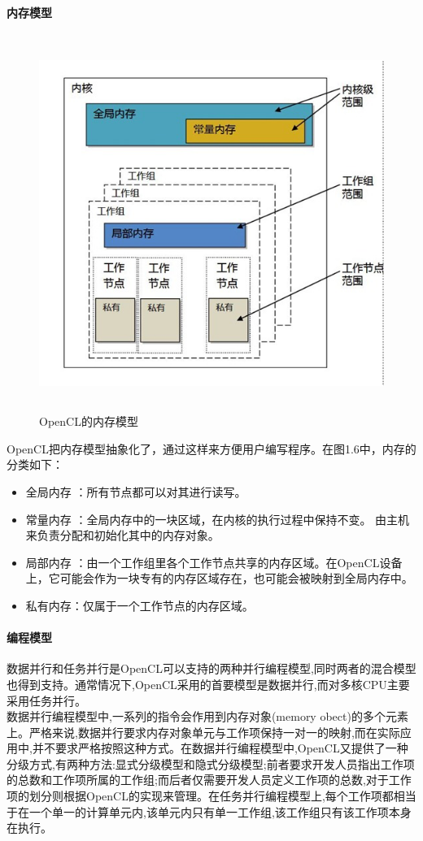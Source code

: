 \documentclass[paper=a4]{ctexart} %
\numberwithin{equation}{section} %
\numberwithin{figure}{section} %
\numberwithin{table}{section} %
\newcommand{\n}{\\\indent}
\begin{document}
\paragraph{内存模型}
\begin{enumerate}
\begin{figure}[htbp]
\centering
\includegraphics[width=4.8in,height=4.8in]{pic/memory.png}
\caption{OpenCL的内存模型}
\end{figure}
\end{enumerate}
OpenCL把内存模型抽象化了，通过这样来方便用户编写程序。在图1.6中，内存的分类如下：
\begin{itemize}
\item 全局内存 ：所有节点都可以对其进行读写。
\item 常量内存 ：全局内存中的一块区域，在内核的执行过程中保持不变。 由主机来负责分配和初始化其中的内存对象。
\item 局部内存 ：由一个工作组里各个工作节点共享的内存区域。在OpenCL设备上，它可能会作为一块专有的内存区域存在，也可能会被映射到全局内存中。
\item 私有内存：仅属于一个工作节点的内存区域。
\end{itemize}

\paragraph{编程模型}
数据并行和任务并行是OpenCL可以支持的两种并行编程模型,同时两者的混合模型也得到支持。通常情况下,OpenCL采用的首要模型是数据并行,而对多核CPU主要采用任务并行。\n
数据并行编程模型中,一系列的指令会作用到内存对象(memory obect)的多个元素上。严格来说,数据并行要求内存对象单元与工作项保持一对一的映射,而在实际应用中,并不要求严格按照这种方式。在数据并行编程模型中,OpenCL又提供了一种分级方式,有两种方法:显式分级模型和隐式分级模型;前者要求开发人员指出工作项的总数和工作项所属的工作组;而后者仅需要开发人员定义工作项的总数,对于工作项的划分则根据OpenCL的实现来管理。在任务并行编程模型上,每个工作项都相当于在一个单一的计算单元内,该单元内只有单一工作组,该工作组只有该工作项本身在执行。
\end{document}

